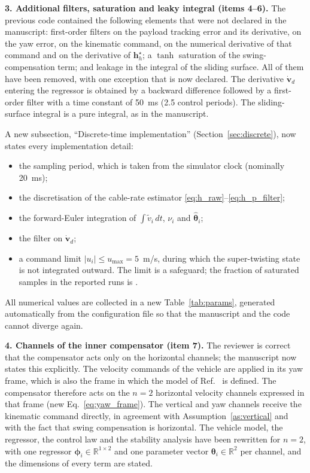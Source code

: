 \begin{reply}
\medskip
\noindent\textbf{3. Additional filters, saturation and leaky integral (items 4--6).}
The previous code contained the following elements that were not declared in the manuscript: first-order filters on the payload tracking error and its derivative, on the yaw error, on the kinematic command, on the numerical derivative of that command and on the derivative of $\mathbf{h}^\star_h$; a $\tanh$ saturation of the swing-compensation term; and leakage in the integral of the sliding surface. All of them have been removed, with one exception that is now declared. The derivative $\dot{\mathbf{v}}_d$ entering the regressor is obtained by a backward difference followed by a first-order filter with a time constant of 50~ms (2.5 control periods). The sliding-surface integral is a pure integral, as in the manuscript.

A new subsection, ``Discrete-time implementation'' (Section~\ref{sec:discrete}), now states every implementation detail:
\begin{itemize}
\item the sampling period, which is taken from the simulator clock (nominally 20~ms);
\item the discretisation of the cable-rate estimator \eqref{eq:h_raw}--\eqref{eq:h_p_filter};
\item the forward-Euler integration of $\int\tilde{v}_i\,dt$, $\nu_i$ and $\hat{\boldsymbol{\theta}}_i$;
\item the filter on $\dot{\mathbf{v}}_d$;
\item a command limit $|u_i|\le u_{\max}=5$~m/s, during which the super-twisting state is not integrated outward. The limit is a safeguard; the fraction of saturated samples in the reported runs is \XX.
\end{itemize}
All numerical values are collected in a new Table~\ref{tab:params}, generated automatically from the configuration file so that the manuscript and the code cannot diverge again.

\medskip
\noindent\textbf{4. Channels of the inner compensator (item 7).}
The reviewer is correct that the compensator acts only on the horizontal channels; the manuscript now states this explicitly. The velocity commands of the vehicle are applied in its yaw frame, which is also the frame in which the model of Ref.~\cite{Lucas_ICUAS2014} is defined. The compensator therefore acts on the $n=2$ horizontal velocity channels expressed in that frame (new Eq.~\eqref{eq:yaw_frame}). The vertical and yaw channels receive the kinematic command directly, in agreement with Assumption~\ref{as:vertical} and with the fact that swing compensation is horizontal. The vehicle model, the regressor, the control law and the stability analysis have been rewritten for $n=2$, with one regressor $\boldsymbol{\phi}_i\in\mathbb{R}^{1\times2}$ and one parameter vector $\boldsymbol{\theta}_i\in\mathbb{R}^{2}$ per channel, and the dimensions of every term are stated.


\end{reply}
